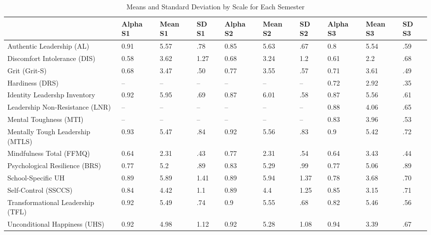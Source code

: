 \begin{table}[ht]
\centering
\begin{tabular}{llll|lll|lll}
  \hline
 & Alpha S1 & Mean S1 & SD S1 & Alpha S2 & Mean S2 & SD S2 & Alpha S3 & Mean S3 & SD S3 \\ 
  \hline
Authentic Leadership (AL) & 0.91 & 5.57 & .78 & 0.85 & 5.63 & .67 & 0.8 & 5.54 & .59 \\ 
  Discomfort Intolerance (DIS) & 0.58 & 3.62 & 1.27 & 0.68 & 3.24 & 1.2 & 0.61 & 2.2 & .68 \\ 
  Grit (Grit-S) & 0.68 & 3.47 & .50 & 0.77 & 3.55 & .57 & 0.71 & 3.61 & .49 \\ 
  Hardiness (DRS) & -- & -- & -- & -- & -- & -- & 0.72 & 2.92 & .35 \\ 
  Identity Leadershp Inventory & 0.92 & 5.95 & .69 & 0.87 & 6.01 & .58 & 0.87 & 5.56 & .61 \\ 
  Leadership Non-Resistance (LNR) & -- & -- & -- & -- & -- & -- & 0.88 & 4.06 & .65 \\ 
  Mental Toughness (MTI) & -- & -- & -- & -- & -- & -- & 0.83 & 3.96 & .53 \\ 
  Mentally Tough Leadership (MTLS) & 0.93 & 5.47 & .84 & 0.92 & 5.56 & .83 & 0.9 & 5.42 & .72 \\ 
  Mindfulness Total (FFMQ) & 0.64 & 2.31 & .43 & 0.77 & 2.31 & .54 & 0.64 & 3.43 & .44 \\ 
  Psychological Resilience (BRS) & 0.77 & 5.2 & .89 & 0.83 & 5.29 & .99 & 0.77 & 5.06 & .89 \\ 
  School-Specific UH & 0.89 & 5.89 & 1.41 & 0.89 & 5.94 & 1.37 & 0.78 & 3.68 & .70 \\ 
  Self-Control (SSCCS) & 0.84 & 4.42 & 1.1 & 0.89 & 4.4 & 1.25 & 0.85 & 3.15 & .71 \\ 
  Transformational Leadership (TFL) & 0.92 & 5.49 & .74 & 0.9 & 5.55 & .68 & 0.82 & 5.46 & .56 \\ 
  Unconditional Happiness (UHS) & 0.92 & 4.98 & 1.12 & 0.92 & 5.28 & 1.08 & 0.94 & 3.39 & .67 \\ 
   \hline
\end{tabular}
\caption{Means and Standard Deviation by Scale for Each Semester} 
\label{tab:summarystats}
\end{table}

